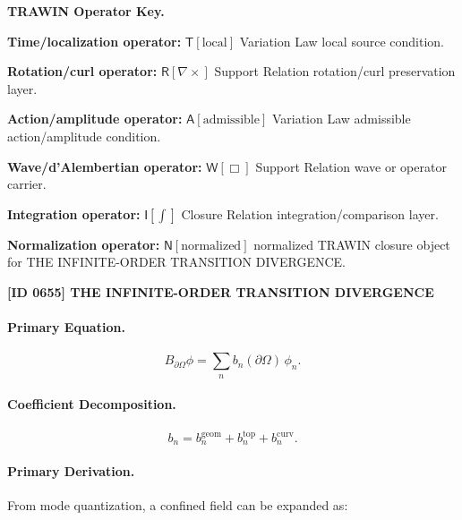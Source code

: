 \par\vspace{0.45\baselineskip}
\noindent\begin{minipage}[t]{\linewidth}
\begingroup
\small
\raggedright
\textbf{TRAWIN Operator Key.}\par
\noindent\textbf{Time/localization operator:} $\mathsf{T}\!\left[\mathrm{local}\right]$ Variation Law local source condition.\par
\noindent\textbf{Rotation/curl operator:} $\mathsf{R}\!\left[\nabla\times\right]$ Support Relation rotation/curl preservation layer.\par
\noindent\textbf{Action/amplitude operator:} $\mathsf{A}\!\left[\mathrm{admissible}\right]$ Variation Law admissible action/amplitude condition.\par
\noindent\textbf{Wave/d'Alembertian operator:} $\mathsf{W}\!\left[\Box\right]$ Support Relation wave or operator carrier.\par
\noindent\textbf{Integration operator:} $\mathsf{I}\!\left[\int\right]$ Closure Relation integration/comparison layer.\par
\noindent\textbf{Normalization operator:} $\mathsf{N}\!\left[\mathrm{normalized}\right]$ normalized TRAWIN closure object for THE INFINITE-ORDER TRANSITION DIVERGENCE.\par
\endgroup
\end{minipage}

\clearpage
\noindent\textbf{[ID 0655] THE INFINITE-ORDER TRANSITION DIVERGENCE}\par
\vspace{0.35em}
\paragraph{Primary Equation.}
\begin{equation}
B_{\partial\Omega}\phi
=
\sum_n b_n(\partial\Omega)\,\phi_n .
\end{equation}

\paragraph{Coefficient Decomposition.}
\begin{equation}
b_n
=
b_n^{\mathrm{geom}}
+
b_n^{\mathrm{top}}
+
b_n^{\mathrm{curv}} .
\end{equation}

\paragraph{Primary Derivation.}
From mode quantization, a confined field can be expanded as:

